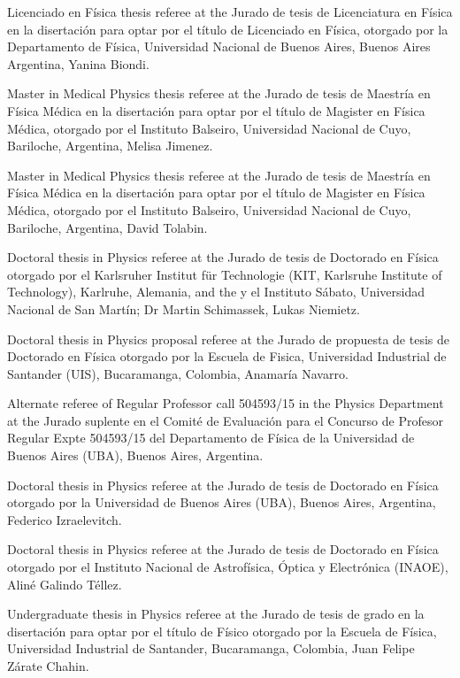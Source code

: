 \ifeng
Licenciado en Física thesis referee at the
\else
Jurado de tesis de Licenciatura en Física en la disertación para optar por el título de Licenciado en Física, otorgado por la 
\fi
Departamento de Física, Universidad Nacional de Buenos Aires, Buenos Aires Argentina, Yanina Biondi.

\ifeng
Master in Medical Physics thesis referee at the
\else
Jurado de tesis de Maestría en Física Médica en la disertación para optar por el título de Magister en Física Médica, otorgado por el 
\fi
Instituto Balseiro, Universidad Nacional de Cuyo, Bariloche, Argentina, Melisa Jimenez.

\ifeng
Master in Medical Physics thesis referee at the
\else
Jurado de tesis de Maestría en Física Médica en la disertación para optar por el título de Magister en Física Médica, otorgado por el 
\fi
Instituto Balseiro, Universidad Nacional de Cuyo, Bariloche, Argentina, David Tolabin.

\ifeng
Doctoral thesis in Physics referee at the 
\else
Jurado de tesis de Doctorado en Física otorgado por el 
\fi
Karlsruher Institut für Technologie (KIT, Karlsruhe Institute of Technology), Karlruhe, Alemania, \ifeng and the \else y el \fi Instituto Sábato, Universidad Nacional de San Martín; Dr Martin Schimassek, Lukas Niemietz.

\ifeng
Doctoral thesis in Physics proposal referee at the 
\else
Jurado de propuesta de tesis de Doctorado en Física otorgado por la 
\fi
Escuela de Fisica, Universidad Industrial de Santander (UIS), Bucaramanga, Colombia, Anamaría Navarro.

\ifeng
Alternate referee of Regular Professor call 504593/15 in the Physics Department at the  
\else
Jurado suplente en el Comité de Evaluación para el Concurso de Profesor Regular Expte 504593/15 del Departamento de Física de la 
\fi
Universidad de Buenos Aires (UBA), Buenos Aires, Argentina.

\ifeng
Doctoral thesis in Physics referee at the 
\else
Jurado de tesis de Doctorado en Física otorgado por la 
\fi
Universidad de Buenos Aires (UBA), Buenos Aires, Argentina, Federico Izraelevitch.

\ifeng
Doctoral thesis in Physics referee at the 
\else
Jurado de tesis de Doctorado en Física otorgado por el 
\fi
Instituto Nacional de Astrofísica, Óptica y Electrónica (INAOE), Aliné Galindo Téllez.

\ifeng
Undergraduate thesis in Physics referee at the  
\else
Jurado de tesis de grado en la disertación para optar por el título de Físico otorgado por la 
\fi
Escuela de Física, Universidad Industrial de Santander, Bucaramanga, Colombia, Juan Felipe Zárate Chahin.

